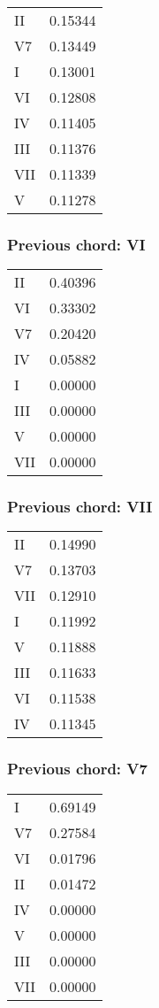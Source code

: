 \begin{tabular}{l l}
II & 0.15344 \\
V7 & 0.13449 \\
I & 0.13001 \\
VI & 0.12808 \\
IV & 0.11405 \\
III & 0.11376 \\
VII & 0.11339 \\
V & 0.11278 \\
\end{tabular}


\subsubsection*{Previous chord: VI}


\begin{tabular}{l l}
II & 0.40396 \\
VI & 0.33302 \\
V7 & 0.20420 \\
IV & 0.05882 \\
I & 0.00000 \\
III & 0.00000 \\
V & 0.00000 \\
VII & 0.00000 \\
\end{tabular}


\subsubsection*{Previous chord: VII}


\begin{tabular}{l l}
II & 0.14990 \\
V7 & 0.13703 \\
VII & 0.12910 \\
I & 0.11992 \\
V & 0.11888 \\
III & 0.11633 \\
VI & 0.11538 \\
IV & 0.11345 \\
\end{tabular}


\subsubsection*{Previous chord: V7}


\begin{tabular}{l l}
I & 0.69149 \\
V7 & 0.27584 \\
VI & 0.01796 \\
II & 0.01472 \\
IV & 0.00000 \\
V & 0.00000 \\
III & 0.00000 \\
VII & 0.00000 \\
\end{tabular}

